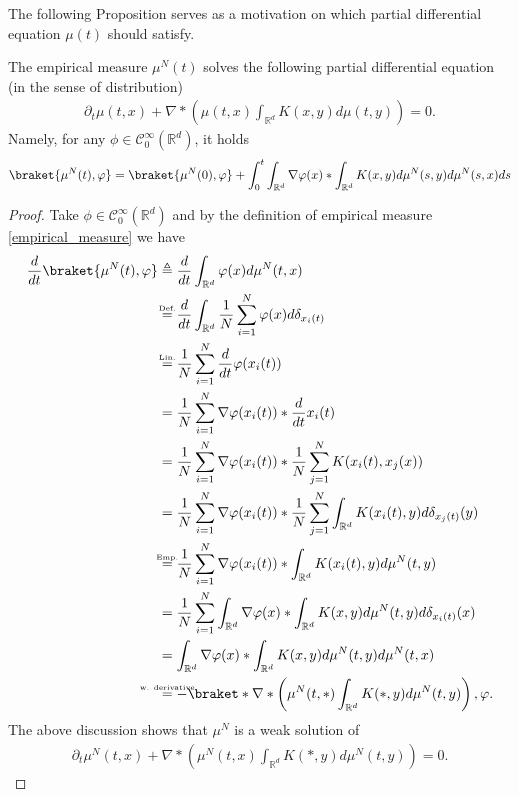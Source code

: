 \vskip5mm
The following Proposition serves as a motivation on which partial differential equation $\mu(t)$ should satisfy.
\begin{prop}
 The empirical measure $\mu^N(t)$ solves the following partial differential equation (in the sense of distribution)
\begin{align*}
  \partial_t \mu(t,x) + \nabla * \left( \mu(t,x) \int_{\mathbb{R}^{d} } K(x,y) d\mu(t,y) \right)  = 0
.\end{align*}  
Namely, for any $\phi  \in  \mathcal{C}_0^{\infty}(\mathbb{R}^{d} )$, it holds
\begin{align*}
\braket{\mu^N(t),\phi }=\braket{\mu^N(0),\phi }+\int^t_0  \int_{\mathbb{R}^{d} } \nabla \phi (x) * \int_{\mathbb{R}^{d} } K(x,y) d\mu^N(s,y)d\mu^N(s,x) ds
\end{align*}
\end{prop}
\begin{proof}
  Take $\phi  \in  \mathcal{C}_0^{\infty}(\mathbb{R}^{d} ) $ and by the definition of empirical measure \autoref{empirical_measure} we have
\begin{align*}
  \frac{d}{dt} \braket{\mu^N(t),\phi } &\triangleq \frac{d}{dt} \int_{\mathbb{R}^{d} } \phi(x) d\mu^N(t,x)  \\
                                       &\myS{Def.}{=} \frac{d}{dt} \int_{\mathbb{R}^{d} } \frac{1}{N} \sum_{i=1}^{N} \phi(x)d\delta_{x_{i}(t)}\\
                                       &\myS{Lin.}{=} \frac{1}{N} \sum_{i=1}^{N}  \frac{d}{dt} \phi (x_i(t))\\
                                       &= \frac{1}{N} \sum_{i=1}^{N} \nabla \phi(x_i(t)) *\frac{d}{dt} x_i(t)\\
                                       &= \frac{1}{N} \sum_{i=1}^{N} \nabla \phi(x_i(t)) *\frac{1}{N}\sum_{j=1}^{N} K(x_{i}(t),x_{j}(x)) \\
                                       &= \frac{1}{N} \sum_{i=1}^{N} \nabla \phi(x_i(t)) *\frac{1}{N}\sum_{j=1}^{N} \int_{\mathbb{R}^{d}} K(x_{i}(t),y) d \delta_{x_j(t)}(y) \\ 
                                       &\myS{Emp.}{=}  \frac{1}{N} \sum_{i=1}^{N} \nabla \phi(x_i(t)) * \int_{\mathbb{R}^{d}} K(x_{i}(t),y) d\mu^{N}(t,y) \\ 
                                       &= \frac{1}{N} \sum_{i=1}^{N} \int_{\mathbb{R}^{d} } \nabla \phi(x) * \int_{\mathbb{R}^{d} } K(x,y) d\mu^N(t,y) d\delta_{x_i(t)}(x)\\
                                       &= \int_{\mathbb{R}^{d} } \nabla \phi (x) * \int_{\mathbb{R}^{d} } K(x,y) d\mu^N(t,y)d\mu^N(t,x)\\
                                       &\myS{w. derivative}{=} -\braket*{\nabla*\left(\mu^N(t,*)\int_{\mathbb{R}^{d}}K(*,y) d\mu^N(t,y) \right),\phi }
.\end{align*}  
The above discussion shows that $\mu^N$ is a weak solution of
\begin{align*}
  \partial_t \mu^N(t,x) + \nabla * \left( \mu^N(t,x) \int_{\mathbb{R}^{d} } K(*,y) d\mu^N(t,y) \right)  = 0
.\end{align*}  
\end{proof}

